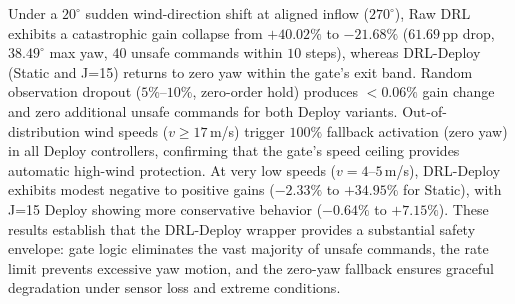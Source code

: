 \documentclass[final,5p,times]{elsarticle}
\begin{document}
Under a $20^\circ$ sudden wind-direction shift at aligned inflow ($270^\circ$), Raw DRL exhibits a catastrophic gain collapse from $+40.02\%$ to $-21.68\%$ ($61.69$\,pp drop, $38.49^\circ$ max yaw, $40$ unsafe commands within $10$ steps), whereas DRL-Deploy (Static and J=15) returns to zero yaw within the gate's exit band. Random observation dropout ($5\%$--$10\%$, zero-order hold) produces ${<}0.06\%$ gain change and zero additional unsafe commands for both Deploy variants. Out-of-distribution wind speeds ($v{\geq}17$\,m/s) trigger $100\%$ fallback activation (zero yaw) in all Deploy controllers, confirming that the gate's speed ceiling provides automatic high-wind protection. At very low speeds ($v{=}4$--$5$\,m/s), DRL-Deploy exhibits modest negative to positive gains ($-2.33\%$ to $+34.95\%$ for Static), with J=15 Deploy showing more conservative behavior ($-0.64\%$ to $+7.15\%$). These results establish that the DRL-Deploy wrapper provides a substantial safety envelope: gate logic eliminates the vast majority of unsafe commands, the rate limit prevents excessive yaw motion, and the zero-yaw fallback ensures graceful degradation under sensor loss and extreme conditions.
\end{document}
